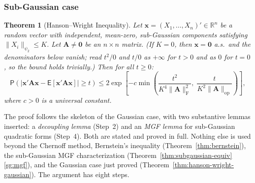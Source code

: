\documentclass[14pt]{extarticle}
\theoremstyle{plain}
\newtheorem{theorem}{Theorem}[section]
\theoremstyle{definition}
\theoremstyle{remark}
\newcommand\expc{\mathsf{E}}
\newcommand\prb{\mathsf{P}}
\newcommand{\bx}{\mathbf{x}}
\newcommand{\bzero}{\mathbf{0}}
\newcommand{\bA}{\mathbf{A}}
\newcommand{\Real}{\mathbb{R}}
\newcommand{\opnorm}[1]{\|#1\|_{\mathrm{op}}}
\newcommand{\fnorm}[1]{\|#1\|_{\mathrm{F}}}
\begin{document}
\subsubsection*{Sub-Gaussian case}

\begin{theorem}[Hanson--Wright Inequality]\label{thm:hanson-wright}
Let $\bx = (X_1, \ldots, X_n)' \in \Real^n$ be a random vector with independent, mean-zero, sub-Gaussian components satisfying $\|X_i\|_{\psi_2} \leqslant K$. Let $\bA \neq \bzero$ be an $n \times n$ matrix. (If $K = 0$, then $\bx = \bzero$ a.s.\ and the denominators below vanish; read $t^2/0$ and $t/0$ as $+\infty$ for $t > 0$ and as $0$ for $t = 0$, so the bound holds trivially.) Then for all $t \geqslant 0$:
\begin{equation}\label{eq:hanson-wright}
\boxed{\prb\!\left(\left|\bx'\bA\bx - \expc[\bx'\bA\bx]\right| \geqslant t\right) \leqslant 2\exp\!\left[-c\min\!\left(\frac{t^2}{K^4\fnorm{\bA}^2},\; \frac{t}{K^2\opnorm{\bA}}\right)\right],}
\end{equation}
where $c > 0$ is a universal constant.
\end{theorem}

The proof follows the skeleton of the Gaussian case, with two substantive lemmas inserted: a \emph{decoupling lemma} (Step~2) and an \emph{MGF lemma} for sub-Gaussian quadratic forms (Step~4). Both are stated and proved in full. Nothing else is used beyond the Chernoff method, Bernstein's inequality (Theorem~\ref{thm:bernstein}), the sub-Gaussian MGF characterization (Theorem~\ref{thm:subgaussian-equiv}\ref{sg:mgf}), and the Gaussian case just proved (Theorem~\ref{thm:hanson-wright-gaussian}). The argument has eight steps.
\end{document}
